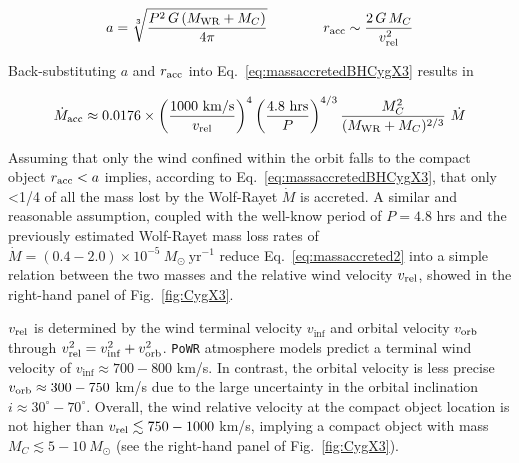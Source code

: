 \documentclass[a4paper,titlepage]{book}     	%
\newcommand{\sun}{\ensuremath{_\odot}}
\newcommand{\mdot}{\ensuremath{\dot{M}}}
\newcommand{\msun}{\ensuremath{M\sun}}
\newcommand{\yr}{\text{yr}}
\newcommand{\mwr}{\ensuremath{M_\textup{WR}}}
\begin{document}
\begin{equation}
    a = \sqrt[3]{\frac{P^2 \,{}G\,{} (\mwr + M_C)}{4 \pi}} \qquad \qquad r_{\rm acc} \sim \frac{2\,{} G\,{} M_C}{v_{\rm rel}^2} 
\end{equation}

Back-substituting $a$ and $r_{\rm acc}$ into Eq.\ \ref{eq:massaccretedBHCygX3} results in

\begin{equation}\label{eq:massaccreted2}
    \mdot_{\rm acc} \approx 0.0176 \times \left( \frac{1000~\rm km/s}{v_{\rm rel}} \right)^4 \left( \frac{4.8~\text{hrs}}{P} \right)^{4/3} \frac{M_C^2}{(\mwr + M_C)^{2/3}}   ~ \mdot
\end{equation}

Assuming that only the wind confined within the orbit falls to the compact object $r_{\rm acc} < a$ implies, according to Eq.\ \ref{eq:massaccretedBHCygX3}, that only <1/4 of all the mass lost by the Wolf-Rayet $\mdot$ is accreted. A similar and reasonable assumption, coupled with the well-know period of $P=4.8$ hrs \cite{CygX-3_Singh2002} and the previously estimated Wolf-Rayet mass loss rates of $\mdot = (0.4-2.0)\times 10^{-5}~\msun~\yr^{-1}$ \cite{CygX-3_Koljonen2017} reduce Eq.\ \ref{eq:massaccreted2} into a simple relation between the two masses and the relative wind velocity $v_{\rm rel}$, showed in the right-hand panel of Fig.\ \ref{fig:CygX3}. 

$v_{\rm rel}$ is determined by the wind terminal velocity $v_{\inf}$ and orbital velocity $v_{\rm  orb}$ through $v_{\rm rel}^2 = v_{\inf}^2 + v_{\rm orb}^2$. \texttt{PoWR} atmosphere models predict a terminal wind velocity of $v_{\inf} \approx 700-800$ km/s. In contrast, the orbital velocity is less precise $v_{\rm orb} \approx 300-750$ km/s due to the large uncertainty in the orbital inclination $i \approx 30^{\circ}-70^{\circ}$. Overall, the wind relative velocity at the compact object location is not higher than $v_{\rm rel} \lesssim 750-1000$ km/s, implying a compact object with mass $M_C \lesssim 5-10~\msun$ (see the right-hand panel of Fig.\ \ref{fig:CygX3}). 
\end{document}
